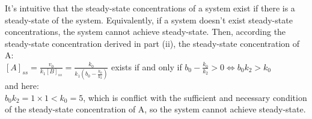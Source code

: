 \documentclass[paper=a4, fontsize=11pt]{scrartcl} %
\numberwithin{equation}{section} %
\numberwithin{figure}{section} %
\numberwithin{table}{section} %
\begin{document}
\begin{enumerate}[a)]
\begin{enumerate}[i)]
			It's intuitive that the steady-state concentrations of a system exist if there is a steady-state of the system. Equivalently, if a system doesn't exist steady-state concentrations, the system cannot achieve steady-state. Then, according the steady-state concentration derived in part (ii), the steady-state concentration of A:\\
			$\left[A\right]_{ss}=\frac{v_{0}}{k_{1}\left[ B\right]_{ss}}=\frac{k_{0}}{k_{1}(b_{0}-\frac{k_{0}}{k_{2}})}$ exists  if and only if $b_{0}-\frac{k_{0}}{k_{2}}>0 \Leftrightarrow b_{0}k_{2}>k_{0}$ \\
			and here:\\
			$b_{0}k_{2}=1 \times 1<k_{0}=5$, which is conflict with the sufficient and necessary condition of the steady-state concentration of A, so the system cannot achieve steady-state. 
		\end{enumerate}

	\end{enumerate}
\end{document}

